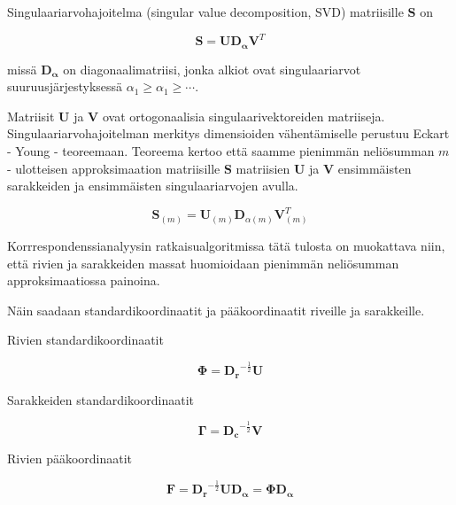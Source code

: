 \documentclass[
  finnish,
]{book}
\begin{document}
Singulaariarvohajoitelma (singular value decomposition, SVD) matriisille \(\boldsymbol{S}\) on

\begin{equation}
\boldsymbol{S} = \boldsymbol{U} \boldsymbol{D_{\alpha}} \boldsymbol{V}^{T}
\label{eq:svd2}
\end{equation}

missä \(\boldsymbol{D_{\alpha}}\) on diagonaalimatriisi, jonka alkiot ovat
singulaariarvot suuruusjärjestyksessä \(\alpha_{1}\geq \alpha_{1} \geq \cdots\).

Matriisit \(\boldsymbol{U}\) ja \(\boldsymbol{V}\) ovat ortogonaalisia
singulaarivektoreiden matriiseja. Singulaariarvohajoitelman merkitys dimensioiden
vähentämiselle perustuu Eckart - Young - teoreemaan. Teoreema kertoo
että saamme pienimmän neliösumman \(m\) - ulotteisen approksimaation matriisille
\(\boldsymbol{S}\) matriisien \(\boldsymbol{U}\) ja \(\boldsymbol{V}\)
ensimmäisten sarakkeiden ja ensimmäisten singulaariarvojen avulla.

\begin{equation}
\boldsymbol{S}_{(m)} = \boldsymbol{U}_{(m)} \boldsymbol{D}_{\alpha(m)} \boldsymbol{V}_{(m)}^{T}
\label{eq:svd3}
\end{equation}

Korrrespondenssianalyysin ratkaisualgoritmissa tätä tulosta on muokattava niin,
että rivien ja sarakkeiden massat huomioidaan pienimmän neliösumman
approksimaatiossa painoina.

Näin saadaan standardikoordinaatit ja pääkoordinaatit riveille ja
sarakkeille.

Rivien standardikoordinaatit

\begin{equation}
\boldsymbol{\Phi} = \boldsymbol{D_r}^{-\frac{1}{2}} \boldsymbol{U}
\label{eq:rivistd1}
\end{equation}

Sarakkeiden standardikoordinaatit

\begin{equation}
 \boldsymbol{\Gamma} = \boldsymbol{D_c}^{-\frac{1}{2}} \boldsymbol{V}
 \label{eq:sarakestd1}
\end{equation}

Rivien pääkoordinaatit

\begin{equation}
 \boldsymbol{F} =   \boldsymbol{D_r}^{-\frac{1}{2}} \boldsymbol{U}  \boldsymbol{D_{\alpha}} = \boldsymbol{\Phi} \boldsymbol{D_{\alpha}}
\label{eq:riviprinc1}
\end{equation}
\end{document}

